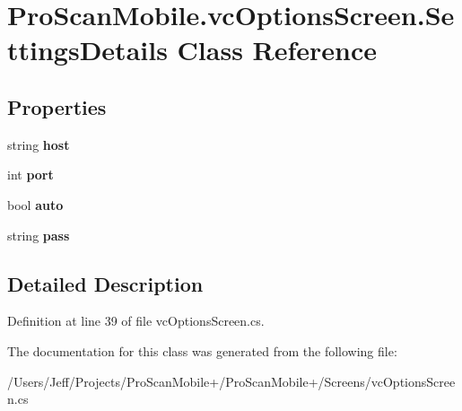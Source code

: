 \hypertarget{class_pro_scan_mobile_1_1vc_options_screen_1_1_settings_details}{\section{Pro\-Scan\-Mobile.\-vc\-Options\-Screen.\-Settings\-Details Class Reference}
\label{class_pro_scan_mobile_1_1vc_options_screen_1_1_settings_details}
}
\subsection*{Properties}
\begin{DoxyCompactItemize}
\item 
\hypertarget{class_pro_scan_mobile_1_1vc_options_screen_1_1_settings_details_ad279dd73ba9c5d76369deee0aedd3c77}{string {\bfseries host}}\label{class_pro_scan_mobile_1_1vc_options_screen_1_1_settings_details_ad279dd73ba9c5d76369deee0aedd3c77}

\item 
\hypertarget{class_pro_scan_mobile_1_1vc_options_screen_1_1_settings_details_a15165280af6125718979d0dd55e89798}{int {\bfseries port}}\label{class_pro_scan_mobile_1_1vc_options_screen_1_1_settings_details_a15165280af6125718979d0dd55e89798}

\item 
\hypertarget{class_pro_scan_mobile_1_1vc_options_screen_1_1_settings_details_ac53111112550aebca182a06f9f966e40}{bool {\bfseries auto}}\label{class_pro_scan_mobile_1_1vc_options_screen_1_1_settings_details_ac53111112550aebca182a06f9f966e40}

\item 
\hypertarget{class_pro_scan_mobile_1_1vc_options_screen_1_1_settings_details_a15c097ac65b52dce1974eecb0cdc4c3c}{string {\bfseries pass}}\label{class_pro_scan_mobile_1_1vc_options_screen_1_1_settings_details_a15c097ac65b52dce1974eecb0cdc4c3c}

\end{DoxyCompactItemize}


\subsection{Detailed Description}


Definition at line 39 of file vc\-Options\-Screen.\-cs.



The documentation for this class was generated from the following file\-:\begin{DoxyCompactItemize}
\item 
/\-Users/\-Jeff/\-Projects/\-Pro\-Scan\-Mobile+/\-Pro\-Scan\-Mobile+/\-Screens/vc\-Options\-Screen.\-cs\end{DoxyCompactItemize}
